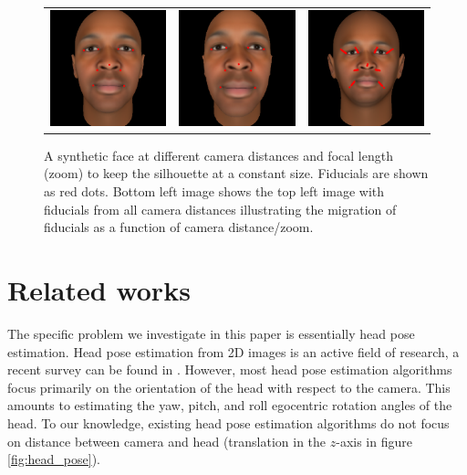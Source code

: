 \documentclass[runningheads]{llncs}
\begin{document}
\begin{figure}[ht]
\begin{tabular}{ccc}
\includegraphics[width=.25\linewidth]{resources/figures/extracted_fiducial_0005.png} &
\includegraphics[width=.25\linewidth]{resources/figures/extracted_fiducial_0007.png} &
\includegraphics[width=.25\linewidth]{resources/figures/fiducial_migration.png}
\end{tabular}
\caption{A synthetic face at different camera distances and focal length (zoom) to keep the silhouette at a constant size.  Fiducials are shown as red dots.  Bottom left image shows the top left image with fiducials from all camera distances illustrating the migration of fiducials as a function of camera distance/zoom.} 
\label{fig:fiducial_migration}
\end{figure}

\section{Related works}
The specific problem we investigate in this paper is essentially head pose estimation.  Head pose estimation from 2D images is an active field of research, a recent survey can be found in \cite{murphy2009head}.  However, most head pose estimation algorithms focus primarily on the orientation of the head with respect to the camera.  This amounts to estimating the yaw, pitch, and roll egocentric rotation angles of the head.  To our knowledge, existing head pose estimation algorithms do not focus on distance between camera and head (translation in the $z$-axis in figure \ref{fig:head_pose}).
\end{document}
